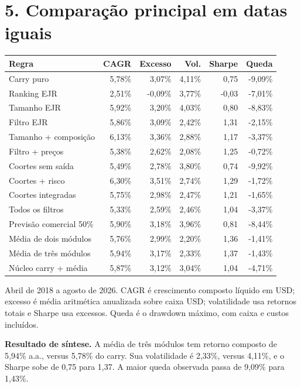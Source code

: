 \documentclass[11pt,a4paper]{article}
\begin{document}
\section*{5. Comparação principal em datas iguais}
\footnotesize\begin{center}\begin{tabular}{lrrrrr}\toprule Regra & CAGR & Excesso & Vol. & Sharpe & Queda\\\midrule 
Carry puro & 5,78\% & 3,07\% & 4,11\% & 0,75 & -9,09\%\\
Ranking EJR & 2,51\% & -0,09\% & 3,77\% & -0,03 & -7,01\%\\
Tamanho EJR & 5,92\% & 3,20\% & 4,03\% & 0,80 & -8,83\%\\
Filtro EJR & 5,86\% & 3,09\% & 2,42\% & 1,31 & -2,15\%\\
Tamanho + composição & 6,13\% & 3,36\% & 2,88\% & 1,17 & -3,37\%\\
Filtro + preços & 5,38\% & 2,62\% & 2,08\% & 1,25 & -0,72\%\\
Coortes sem saída & 5,49\% & 2,78\% & 3,80\% & 0,74 & -9,92\%\\
Coortes + risco & 6,30\% & 3,51\% & 2,74\% & 1,29 & -1,72\%\\
Coortes integradas & 5,75\% & 2,98\% & 2,47\% & 1,21 & -1,65\%\\
Todos os filtros & 5,33\% & 2,59\% & 2,46\% & 1,04 & -3,37\%\\
Previsão comercial 50\% & 5,90\% & 3,18\% & 3,96\% & 0,81 & -8,44\%\\
Média de dois módulos & 5,76\% & 2,99\% & 2,20\% & 1,36 & -1,41\%\\
Média de três módulos & 5,94\% & 3,17\% & 2,33\% & 1,37 & -1,43\%\\
Núcleo carry + média & 5,87\% & 3,12\% & 3,04\% & 1,04 & -4,71\%\\\bottomrule\end{tabular}\end{center}\normalsize

Abril de 2018 a agosto de 2026. CAGR é crescimento composto líquido em USD; excesso é média aritmética anualizada sobre caixa USD; volatilidade usa retornos totais e Sharpe usa excessos. Queda é o drawdown máximo, com caixa e custos incluídos.

\textbf{Resultado de síntese.} A média de três módulos tem retorno composto de 5,94\% a.a., versus 5,78\% do carry. Sua volatilidade é 2,33\%, versus 4,11\%, e o Sharpe sobe de 0,75 para 1,37. A maior queda observada passa de 9,09\% para 1,43\%.
\end{document}
